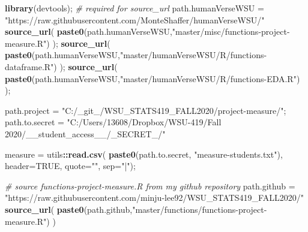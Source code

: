 \documentclass[]{article}
\newenvironment{Shaded}{\begin{snugshade}}{\end{snugshade}}
\newcommand{\CommentTok}[1]{\textcolor[rgb]{0.56,0.35,0.01}{\textit{#1}}}
\newcommand{\DataTypeTok}[1]{\textcolor[rgb]{0.13,0.29,0.53}{#1}}
\newcommand{\KeywordTok}[1]{\textcolor[rgb]{0.13,0.29,0.53}{\textbf{#1}}}
\newcommand{\NormalTok}[1]{#1}
\newcommand{\OperatorTok}[1]{\textcolor[rgb]{0.81,0.36,0.00}{\textbf{#1}}}
\newcommand{\OtherTok}[1]{\textcolor[rgb]{0.56,0.35,0.01}{#1}}
\newcommand{\StringTok}[1]{\textcolor[rgb]{0.31,0.60,0.02}{#1}}
\begin{document}
\vskip -8.5pt




\noindent  

\begin{Shaded}
\begin{Highlighting}[]
\KeywordTok{library}\NormalTok{(devtools);       }\CommentTok{\# required for source\_url}
\NormalTok{path.humanVerseWSU =}\StringTok{ "https://raw.githubusercontent.com/MonteShaffer/humanVerseWSU/"}
\KeywordTok{source\_url}\NormalTok{( }\KeywordTok{paste0}\NormalTok{(path.humanVerseWSU,}\StringTok{"master/misc/functions{-}project{-}measure.R"}\NormalTok{) );}
\KeywordTok{source\_url}\NormalTok{( }\KeywordTok{paste0}\NormalTok{(path.humanVerseWSU,}\StringTok{"master/humanVerseWSU/R/functions{-}dataframe.R"}\NormalTok{) );}
\KeywordTok{source\_url}\NormalTok{( }\KeywordTok{paste0}\NormalTok{(path.humanVerseWSU,}\StringTok{"master/humanVerseWSU/R/functions{-}EDA.R"}\NormalTok{) );}
\end{Highlighting}
\end{Shaded}

\begin{Shaded}
\begin{Highlighting}[]
\NormalTok{path.project =}\StringTok{ "C:/\_git\_/WSU\_STATS419\_FALL2020/project{-}measure/"}\NormalTok{;}
\NormalTok{path.to.secret =}\StringTok{ "C:/Users/13608/Dropbox/WSU{-}419/Fall 2020/\_\_student\_access\_\_/\_SECRET\_/"}

\NormalTok{measure =}\StringTok{ }\NormalTok{utils}\OperatorTok{::}\KeywordTok{read.csv}\NormalTok{( }\KeywordTok{paste0}\NormalTok{(path.to.secret, }\StringTok{"measure{-}students.txt"}\NormalTok{), }\DataTypeTok{header=}\OtherTok{TRUE}\NormalTok{, }\DataTypeTok{quote=}\StringTok{""}\NormalTok{, }\DataTypeTok{sep=}\StringTok{"|"}\NormalTok{);}
\end{Highlighting}
\end{Shaded}

\begin{Shaded}
\begin{Highlighting}[]
\CommentTok{\# source functions{-}project{-}measure.R from my github repository}
\NormalTok{path.github =}\StringTok{ "https://raw.githubusercontent.com/minju{-}lee92/WSU\_STATS419\_FALL2020/"}
\KeywordTok{source\_url}\NormalTok{( }\KeywordTok{paste0}\NormalTok{(path.github,}\StringTok{"master/functions/functions{-}project{-}measure.R"}\NormalTok{) )}
\end{Highlighting}
\end{Shaded}
\end{document}
